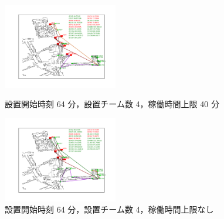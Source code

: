\documentclass[a4paper,12pt,fleqn]{jarticle}
\begin{document}
\begin{figure}
 \begin{center}
  \begin{minipage}{0.49\hsize}
   \begin{center}
    \includegraphics[width=5cm,trim=100 50 100 50]{fig/64min_4team_lim40min.pdf}
    \caption{設置開始時刻 64 分，\newline \quad 設置チーム数 4，稼働時間上限 40 分}
    \label{fig:64min_4team_lim40min}
   \end{center}
  \end{minipage}
  \begin{minipage}{0.49\hsize}
   \begin{center}
    \includegraphics[width=5cm,trim=100 50 100 50]{fig/64min_4team_nolim.pdf}
    \caption{設置開始時刻 64 分，\newline \quad 設置チーム数 4，稼働時間上限なし}
    \label{fig:64min_4team_nolim}
   \end{center}
  \end{minipage}
 \end{center}
\end{figure}
\end{document}
